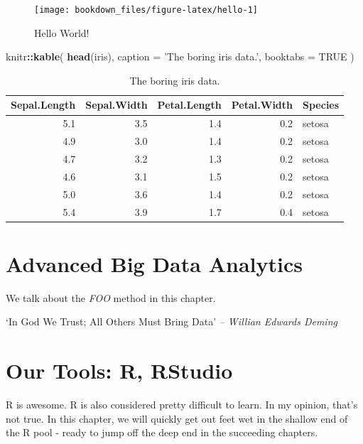 \documentclass[]{krantz}
\makeatletter
\newenvironment{Shaded}{\begin{snugshade}}{\end{snugshade}}
\newcommand{\KeywordTok}[1]{\textcolor[rgb]{0.27,0.27,0.27}{\textbf{#1}}}
\newcommand{\DataTypeTok}[1]{\textcolor[rgb]{0.27,0.27,0.27}{#1}}
\newcommand{\StringTok}[1]{\textcolor[rgb]{0.5,0.5,0.5}{#1}}
\newcommand{\OtherTok}[1]{\textcolor[rgb]{0.56,0.35,0.01}{#1}}
\newcommand{\OperatorTok}[1]{\textcolor[rgb]{0.81,0.36,0.00}{\textbf{#1}}}
\newcommand{\NormalTok}[1]{#1}
\newenvironment{kframe}{%
\medskip{}
\setlength{\fboxsep}{.8em}
 \def\at@end@of@kframe{}%
 \ifinner\ifhmode%
  \def\at@end@of@kframe{\end{minipage}}%
  \begin{minipage}{\columnwidth}%
 \fi\fi%
 \def\FrameCommand##1{\hskip\@totalleftmargin \hskip-\fboxsep
 \colorbox{shadecolor}{##1}\hskip-\fboxsep
     \hskip-\linewidth \hskip-\@totalleftmargin \hskip\columnwidth}%
 \MakeFramed {\advance\hsize-\width
   \@totalleftmargin\z@ \linewidth\hsize
   \@setminipage}}%
 {\par\unskip\endMakeFramed%
 \at@end@of@kframe}
\renewenvironment{Shaded}{\begin{kframe}}{\end{kframe}}
\theoremstyle{definition}
\theoremstyle{definition}
\theoremstyle{definition}
\theoremstyle{remark}
\makeatother
\begin{document}
\begin{figure}
\texttt{[image: bookdown\_files/figure-latex/hello-1]} \caption{Hello World!}\label{fig:hello}
\end{figure}

\begin{Shaded}
\begin{Highlighting}[]
\NormalTok{knitr}\OperatorTok{::}\KeywordTok{kable}\NormalTok{(}
  \KeywordTok{head}\NormalTok{(iris), }\DataTypeTok{caption =} \StringTok{'The boring iris data.'}\NormalTok{,}
  \DataTypeTok{booktabs =} \OtherTok{TRUE}
\NormalTok{)}
\end{Highlighting}
\end{Shaded}

\begin{table}

\caption{\label{tab:iris}The boring iris data.}
\centering
\begin{tabular}[t]{rrrrl}
\toprule
Sepal.Length & Sepal.Width & Petal.Length & Petal.Width & Species\\
\midrule
5.1 & 3.5 & 1.4 & 0.2 & setosa\\
4.9 & 3.0 & 1.4 & 0.2 & setosa\\
4.7 & 3.2 & 1.3 & 0.2 & setosa\\
4.6 & 3.1 & 1.5 & 0.2 & setosa\\
5.0 & 3.6 & 1.4 & 0.2 & setosa\\
5.4 & 3.9 & 1.7 & 0.4 & setosa\\
\bottomrule
\end{tabular}
\end{table}

\chapter{Advanced Big Data Analytics}\label{advanced-big-data-analytics}

We talk about the \emph{FOO} method in this chapter.

`In God We Trust; All Others Must Bring Data' \emph{-- Willian Edwards
Deming}

\chapter{Our Tools: R, RStudio}\label{our-tools-r-rstudio}

R is awesome. R is also considered pretty difficult to learn. In my
opinion, that's not true. In this chapter, we will quickly get out feet
wet in the shallow end of the R pool - ready to jump off the deep end in
the succeeding chapters.
\end{document}

